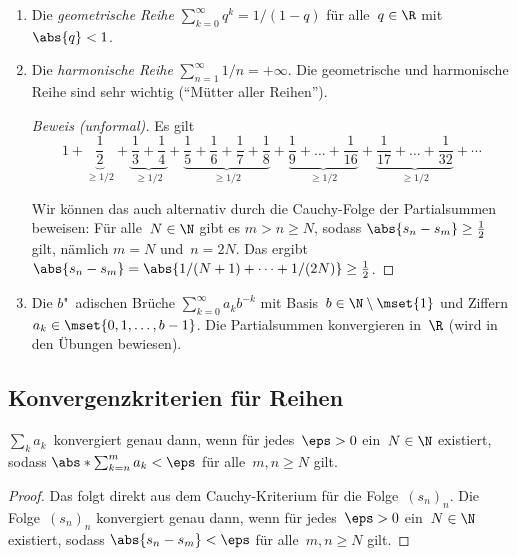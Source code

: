 \documentclass[a4paper]{article}
\begin{document}
\begin{example}\leavevmode
    \begin{enumerate}
        \item Die \emph{geometrische Reihe} $\sum_{k=0}^\infty q^k = 1/(1-q)$ für alle~$q \in \R$ mit~$\abs{q} < 1$.
        \item Die \emph{harmonische Reihe} $\sum_{n=1}^\infty 1/n = +\infty$. Die geometrische und harmonische Reihe sind sehr wichtig ("`Mütter aller Reihen"').
              \begin{proof}[Beweis (unformal)]
                  Es gilt
                  \begin{equation*}
                      1 + \underbrace{\frac{1}{2}}_{\geq 1/2} + \underbrace{\frac{1}{3} + \frac{1}{4}}_{\geq 1/2} + \underbrace{\frac{1}{5} + \frac{1}{6} + \frac{1}{7} + \frac{1}{8}}_{\geq 1/2} + \underbrace{\frac{1}{9} + \dots + \frac{1}{16}}_{\geq 1/2} + \underbrace{\frac{1}{17} + \dots + \frac{1}{32}}_{\geq 1/2} + \cdots
                  \end{equation*}

                  Wir können das auch alternativ durch die Cauchy-Folge der Partialsummen beweisen: Für alle~$N \in \N$ gibt es $m > n \geq N$, sodass $\abs{s_n - s_m} \geq \frac{1}{2}$ gilt, nämlich $m = N$ und~$n = 2N$. Das ergibt $\abs{s_n - s_m} = \abs{1/(N+1) + \dots + 1/(2N)} \geq \frac{1}{2}$.
              \end{proof}
        \item Die $b$"~adischen Brüche $\sum_{k=0}^\infty a_k b^{-k}$ mit Basis~$b \in \N\setminus\mset{1}$ und Ziffern $a_k \in \mset{0, 1, \dots, b-1}$. Die Partialsummen konvergieren in~$\R$ (wird in den Übungen bewiesen).
    \end{enumerate}
\end{example}

\subsection{Konvergenzkriterien für Reihen}

\begin{theorem}
    $\sum_k a_k$~konvergiert genau dann, wenn für jedes~$\eps > 0$ ein~$N \in \N$ existiert, sodass $\abs*{\sum_{k=n}^m a_k} < \eps$ für alle~$m, n \geq N$ gilt.
\end{theorem}

\begin{proof}
    Das folgt direkt aus dem Cauchy-Kriterium für die Folge~$(s_n)_n$. Die Folge~$(s_n)_n$ konvergiert genau dann, wenn für jedes~$\eps > 0$ ein~$N \in \N$ existiert, sodass $\abs{s_n-s_m} < \eps$ für alle~$m, n \geq N$ gilt.
\end{proof}
\end{document}
